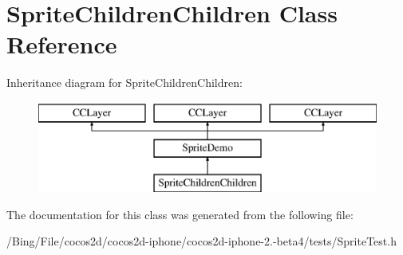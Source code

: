 \hypertarget{interface_sprite_children_children}{\section{Sprite\-Children\-Children Class Reference}
\label{interface_sprite_children_children}
}
Inheritance diagram for Sprite\-Children\-Children\-:\begin{figure}[H]
\begin{center}
\leavevmode
\includegraphics[height=3.000000cm]{interface_sprite_children_children}
\end{center}
\end{figure}


The documentation for this class was generated from the following file\-:\begin{DoxyCompactItemize}
\item 
/\-Bing/\-File/cocos2d/cocos2d-\/iphone/cocos2d-\/iphone-\/2.-\/beta4/tests/Sprite\-Test.\-h\end{DoxyCompactItemize}
